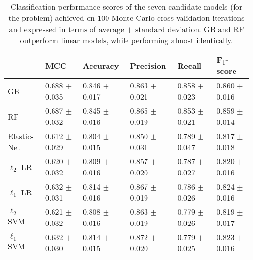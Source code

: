 \begin{table}

\begin{tabular}{llllll}
\toprule
{} &                MCC &           Accuracy &          Precision &             Recall &                 F\textsubscript{$1$}-score \\
\midrule
GB      &  0.688 $\pm$ 0.035 &  0.846 $\pm$ 0.017 &  0.863 $\pm$ 0.021 &  0.858 $\pm$ 0.023 &  0.860 $\pm$ 0.016 \\
RF         &  0.687 $\pm$ 0.032 &  0.845 $\pm$ 0.016 &  0.865 $\pm$ 0.019 &  0.853 $\pm$ 0.021 &  0.859 $\pm$ 0.014 \\
Elastic-Net                   &  0.612 $\pm$ 0.029 &  0.804 $\pm$ 0.015 &  0.850 $\pm$ 0.031 &  0.789 $\pm$ 0.047 &  0.817 $\pm$ 0.018 \\
$\ell_2$ LR &  0.620 $\pm$ 0.032 &  0.809 $\pm$ 0.016 &  0.857 $\pm$ 0.020 &  0.787 $\pm$ 0.027 &  0.820 $\pm$ 0.016 \\
$\ell_1$ LR &  0.632 $\pm$ 0.031 &  0.814 $\pm$ 0.016 &  0.867 $\pm$ 0.019 &  0.786 $\pm$ 0.026 &  0.824 $\pm$ 0.016 \\
$\ell_2$ SVM          &  0.621 $\pm$ 0.032 &  0.808 $\pm$ 0.016 &  0.863 $\pm$ 0.019 &  0.779 $\pm$ 0.026 &  0.819 $\pm$ 0.017 \\
$\ell_1$ SVM          &  0.632 $\pm$ 0.030 &  0.814 $\pm$ 0.015 &  0.872 $\pm$ 0.020 &  0.779 $\pm$ 0.025 &  0.823 $\pm$ 0.016 \\
\bottomrule
\end{tabular}
\caption{Classification performance scores of the seven candidate models (for the \F problem) achieved on $100$ Monte Carlo cross-validation iterations and expressed in terms of average $\pm$ standard deviation. GB and RF outperform linear models, while performing almost identically.} \label{tab:f_scoreboard}
\end{table}

